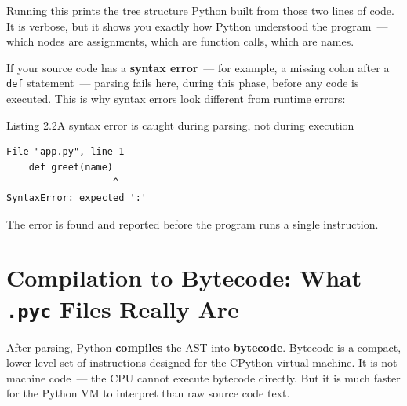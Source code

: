 \noindent{}Running this prints the tree structure Python built from those two lines of code. It is verbose, but it shows you exactly how Python understood the program~--- which nodes are assignments, which are function calls, which are names.

If your source code has a \textbf{syntax error}~--- for example, a missing colon after a \texttt{def} statement~--- parsing fails here, during this phase, before any code is executed. This is why syntax errors look different from runtime errors:

\begin{codeboxcap}[short]{\textcolor{accent}{Listing 2.2}\enspace A syntax error is caught during parsing, not during execution}

\begin{Shaded}
\begin{Highlighting}[]
\end{Highlighting}
\end{Shaded}

\end{codeboxcap}

\begin{outputbox}[short]
\begin{Verbatim}[fontsize=\codesize, breaklines, breakanywhere, breaksymbolleft={\tiny\textcolor{muted}{$\hookrightarrow$}}]
  File "app.py", line 1
    def greet(name)
                   ^
SyntaxError: expected ':'
\end{Verbatim}
\end{outputbox}

\noindent{}The error is found and reported before the program runs a single instruction.

\setcounter{section}{2}
\section{\texorpdfstring{Compilation to Bytecode: What \texttt{.pyc} Files Really Are}{Compilation to Bytecode: What .pyc Files Really Are}}\label{02-runtime-initialization:23-compilation-to-bytecode-what-pyc-files-really-are}

After parsing, Python \textbf{compiles} the AST into \textbf{bytecode}. Bytecode is a compact, lower-level set of instructions designed for the CPython virtual machine. It is not machine code~--- the CPU cannot execute bytecode directly. But it is much faster for the Python VM to interpret than raw source code text.

